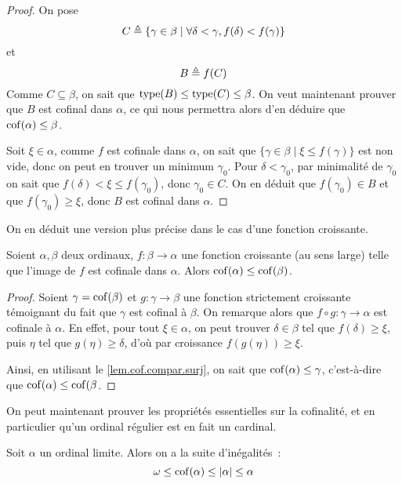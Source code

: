 \begin{proof}
  On pose
  \[C \triangleq \{\gamma \in \beta \mid
  \forall \delta < \gamma, f(\delta) < f(\gamma)\}\]
  et
  \[B \triangleq f(C)\]
  Comme $C\subseteq \beta$, on sait que $\operatorname{type}(B)\leq \operatorname{type}(C) \leq \beta$.
  On veut maintenant prouver que $B$ est cofinal dans $\alpha$, ce qui nous
  permettra alors d'en déduire que $\operatorname{cof}(\alpha) \leq \beta$.

  Soit $\xi \in \alpha$, comme $f$ est cofinale dans $\alpha$, on sait que
  $\{\gamma \in \beta \mid \xi \leq f(\gamma)\}$ est non vide, donc on peut en
  trouver un minimum $\gamma_0$. Pour $\delta < \gamma_0$, par minimalité de
  $\gamma_0$ on sait que $f(\delta) < \xi\leq f(\gamma_0)$, donc
  $\gamma_0 \in C$. On en déduit que $f(\gamma_0)\in B$ et que
  $f(\gamma_0) \geq \xi$, donc $B$ est cofinal dans $\alpha$.
\end{proof}

On en déduit une version plus précise dans le cas d'une fonction croissante.

\begin{proposition}
  Soient $\alpha,\beta$ deux ordinaux, $f : \beta \to \alpha$ une fonction
  croissante (au sens large) telle que l'image de $f$ est cofinale dans
  $\alpha$. Alors $\operatorname{cof}(\alpha)\leq\operatorname{cof}(\beta)$.
\end{proposition}

\begin{proof}
  Soient $\gamma = \operatorname{cof}(\beta)$ et $g : \gamma \to \beta$ une fonction
  strictement croissante témoignant du fait que $\gamma$ est cofinal à $\beta$.
  On remarque alors que $f\circ g : \gamma \to \alpha$ est cofinale à $\alpha$.
  En effet, pour tout $\xi \in \alpha$, on peut trouver $\delta \in \beta$
  tel que $f(\delta) \geq \xi$, puis $\eta$ tel que $g(\eta) \geq \delta$, d'où
  par croissance $f(g(\eta)) \geq \xi$.
  
  Ainsi, en utilisant le \cref{lem.cof.compar.surj}, on sait que
  $\operatorname{cof}(\alpha)\leq \gamma$, c'est-à-dire que $\operatorname{cof}(\alpha)\leq\operatorname{cof}(\beta$.
\end{proof}

On peut maintenant prouver les propriétés essentielles sur la cofinalité, et en
particulier qu'un ordinal régulier est en fait un cardinal.

\begin{proposition}
  Soit $\alpha$ un ordinal limite. Alors on a la suite d'inégalités~:
  \[\omega\leq \operatorname{cof}(\alpha) \leq |\alpha|\leq \alpha\]
\end{proposition}

